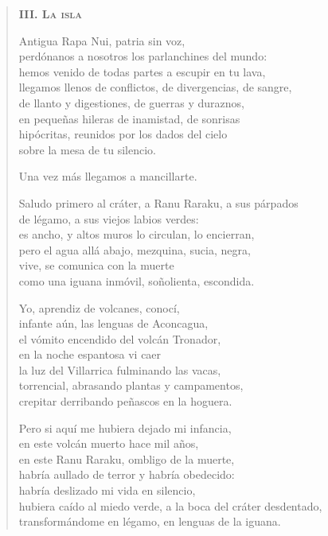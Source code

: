 \documentclass[12pt]{article}
\begin{document}
\clearpage
{}
\begin{verse}

{\bfseries\scshape {III. La isla}}

Antigua Rapa Nui, patria sin voz,\\
perdónanos a nosotros los parlanchines del mundo:\\
hemos venido de todas partes a escupir en tu lava,\\
llegamos llenos de conflictos, de divergencias, de sangre,\\
de llanto y digestiones, de guerras y duraznos,\\
en pequeñas hileras de inamistad, de sonrisas\\
hipócritas, reunidos por los dados del cielo\\
sobre la mesa de tu silencio.  

Una vez más llegamos a mancillarte.  

Saludo primero al cráter, a Ranu Raraku, a sus párpados\\
de légamo, a sus viejos labios verdes:\\
es ancho, y altos muros lo circulan, lo encierran,\\
pero el agua allá abajo, mezquina, sucia, negra,\\
vive, se comunica con la muerte\\
como una iguana inmóvil, soñolienta, escondida.  

Yo, aprendiz de volcanes, conocí,\\
infante aún, las lenguas de Aconcagua,\\
el vómito encendido del volcán Tronador,\\
en la noche espantosa vi caer\\
la luz del Villarrica fulminando las vacas,\\
torrencial, abrasando plantas y campamentos,\\
crepitar derribando peñascos en la hoguera.  

Pero si aquí me hubiera dejado mi infancia,\\
en este volcán muerto hace mil años,\\
en este Ranu Raraku, ombligo de la muerte,\\
habría aullado de terror y habría obedecido:\\
habría deslizado mi vida en silencio,\\
hubiera caído al miedo verde, a la boca del cráter desdentado,\\
transformándome en légamo, en lenguas de la iguana.  


\end{verse}
\end{document}
